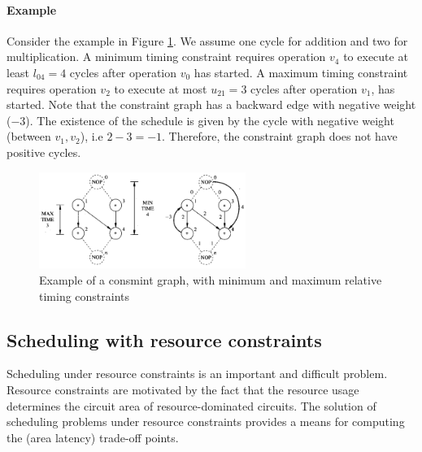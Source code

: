 \paragraph{Example}
Consider the example in Figure \ref{fig:relatTimngConst}.  We assume one cycle for addition and two for multiplication.  A  minimum timing constraint requires operation  $ v_4 $  to execute at least  $ l_{04} = 4 $ cycles after operation  $ v_0 $  has started.  A  maximum timing constraint requires operation $ v_2 $  to execute at most  $ u_{21} = 3 $  cycles after operation  $ v_1 $,  has started. Note that the constraint graph has  a  backward edge with negative weight ($ -3 $). The existence of the schedule is given by the cycle with negative weight (between $ v_1, v_2 $), i.e $ 2 -3 = -1 $. Therefore, the constraint graph does not have positive cycles.
\begin{figure}[H]
    \centering
    \includegraphics[width=0.6\textwidth]{./Cap4/Images/Image07.png}
    \caption{Example  of  a  consmint  graph,  with  minimum  and  maximum  relative timing  constraints}
    \label{fig:relatTimngConst}
\end{figure}

\subsection{Scheduling with resource constraints}
Scheduling under resource constraints is an important and difficult problem. Resource constraints are motivated by the fact that the resource usage determines the circuit area of resource-dominated circuits. The solution of scheduling problems under resource constraints provides a means for computing the (area latency) trade-off points.

